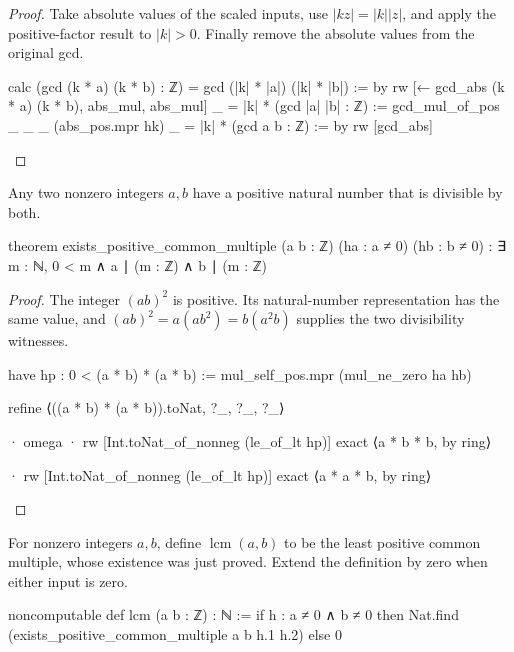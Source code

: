 \begin{proof}

  Take absolute values of the scaled inputs, use $|kz|=|k||z|$, and apply the positive-factor result to $|k|>0$. Finally remove the absolute values from the original gcd.

  \begin{lean}
    calc
      (gcd (k * a) (k * b) : ℤ) = gcd (|k| * |a|) (|k| * |b|) := by
        rw [← gcd_abs (k * a) (k * b), abs_mul, abs_mul]
      _ = |k| * (gcd |a| |b| : ℤ) := gcd_mul_of_pos _ _ _ (abs_pos.mpr hk)
      _ = |k| * (gcd a b : ℤ) := by
        rw [gcd_abs]
  \end{lean}

\end{proof}

\begin{lemma} \label{nt:thm:positive-common-multiple}
  Any two nonzero integers $a,b$ have a positive natural number that is divisible by both.

  \begin{lean}
    theorem exists_positive_common_multiple (a b : ℤ) (ha : a ≠ 0) (hb : b ≠ 0) :
        ∃ m : ℕ, 0 < m ∧ a ∣ (m : ℤ) ∧ b ∣ (m : ℤ)
  \end{lean}
\end{lemma}

\begin{proof}

  The integer $(ab)^2$ is positive. Its natural-number representation has the same value, and $(ab)^2=a(ab^2)=b(a^2b)$ supplies the two divisibility witnesses.

  \begin{lean}
    have hp : 0 < (a * b) * (a * b) := mul_self_pos.mpr (mul_ne_zero ha hb)

    refine ⟨((a * b) * (a * b)).toNat, ?_, ?_, ?_⟩

    · omega
    · rw [Int.toNat_of_nonneg (le_of_lt hp)]
      exact ⟨a * b * b, by ring⟩

    · rw [Int.toNat_of_nonneg (le_of_lt hp)]
      exact ⟨a * a * b, by ring⟩
  \end{lean}

\end{proof}

\begin{definition}
  For nonzero integers $a,b$, define $\operatorname{lcm}(a,b)$ to be the least positive common multiple, whose existence was just proved. Extend the definition by zero when either input is zero.

  \begin{lean}
    noncomputable def lcm (a b : ℤ) : ℕ :=
      if h : a ≠ 0 ∧ b ≠ 0 then
        Nat.find (exists_positive_common_multiple a b h.1 h.2)
      else 0
  \end{lean}
\end{definition}


